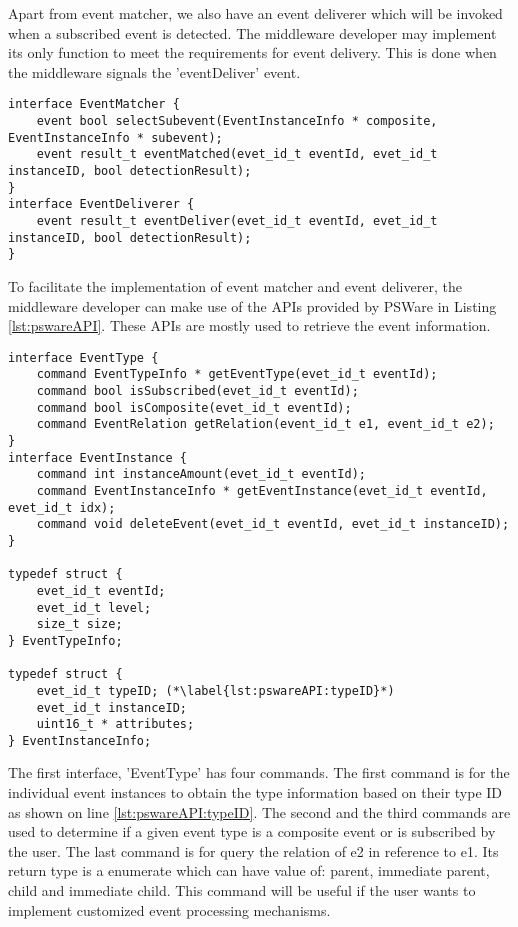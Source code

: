 Apart from event matcher, we also have an event deliverer which will be invoked when a subscribed event is detected. The middleware developer may implement its only function to meet the requirements for event delivery. This is done when the middleware signals the 'eventDeliver' event.
\begin{lstlisting}[caption=The event matcher interface, label=lst:pswareEventMatcher]
interface EventMatcher {
	event bool selectSubevent(EventInstanceInfo * composite, EventInstanceInfo * subevent);
	event result_t eventMatched(evet_id_t eventId, evet_id_t instanceID, bool detectionResult);
}
interface EventDeliverer {
	event result_t eventDeliver(evet_id_t eventId, evet_id_t instanceID, bool detectionResult);
}
\end{lstlisting}

To facilitate the implementation of event matcher and event deliverer, the middleware developer can make use of the APIs provided by PSWare in Listing \ref{lst:pswareAPI}. These APIs are mostly used to retrieve the event information.
\begin{lstlisting}[caption=PSWare API in NesC, label=lst:pswareAPI]
interface EventType {
	command EventTypeInfo * getEventType(evet_id_t eventId);
	command bool isSubscribed(evet_id_t eventId);
	command bool isComposite(evet_id_t eventId);
	command EventRelation getRelation(event_id_t e1, event_id_t e2);
}
interface EventInstance {
	command int instanceAmount(evet_id_t eventId);
	command EventInstanceInfo * getEventInstance(evet_id_t eventId, evet_id_t idx);
	command void deleteEvent(evet_id_t eventId, evet_id_t instanceID);
}

typedef struct {
	evet_id_t eventId;
	evet_id_t level;
	size_t size;
} EventTypeInfo;

typedef struct {
	evet_id_t typeID; (*\label{lst:pswareAPI:typeID}*)
	evet_id_t instanceID;
	uint16_t * attributes;
} EventInstanceInfo;
\end{lstlisting}

The first interface, 'EventType' has four commands. The first command is for the individual event instances to obtain the type information based on their type ID as shown on line \ref{lst:pswareAPI:typeID}. The second and the third commands are used to determine if a given event type is a composite event or is subscribed by the user. The last command is for query the relation of e2 in reference to e1. Its return type is a enumerate which can have value of: parent, immediate parent, child and immediate child. This command will be useful if the user wants to implement customized event processing mechanisms.

